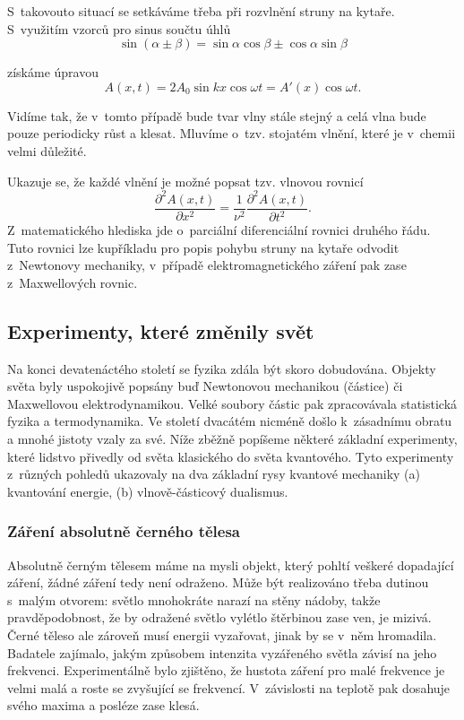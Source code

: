 \noindent S~takovouto situací se setkáváme třeba při rozvlnění struny na kytaře. S~využitím vzorců pro sinus součtu úhlů
\begin{equation}
\sin(\alpha \pm \beta) = \sin \alpha\cos\beta \pm \cos\alpha\sin\beta
\label{rov:Vlna7}
\end{equation}

\noindent získáme úpravou
\begin{equation}
A(x,t)=2A_0\sin kx \cos \omega t = A'(x)\cos \omega t.
\label{rov:Vlna8}
\end{equation}

\noindent Vidíme tak, že v~tomto případě bude tvar vlny stále stejný a celá vlna bude pouze periodicky růst a klesat. Mluvíme o~tzv. stojatém vlnění, které je v~chemii velmi důležité.

Ukazuje se, že každé vlnění je možné popsat tzv. vlnovou rovnicí
\begin{equation}
\frac{\partial ^2A(x,t)}{\partial x^2} = \frac{1}{\nu^2}\frac{\partial^2A(x,t)}{\partial t^2}\mbox{.}
\label{rov:Vlna9}
\end{equation}
Z~matematického hlediska jde o~parciální diferenciální rovnici druhého řádu. Tuto rovnici lze kupříkladu pro popis pohybu struny na kytaře odvodit z~Newtonovy mechaniky, v~případě elektromagnetického záření pak zase z~Maxwellových rovnic. 

\subsection{Experimenty, které změnily svět}

Na konci devatenáctého století se fyzika zdála být skoro dobudována. Objekty světa byly uspokojivě popsány buď Newtonovou mechanikou (částice) či Maxwellovou elektrodynamikou. Velké soubory částic pak zpracovávala statistická fyzika a termodynamika. Ve století dvacátém nicméně došlo k~zásadnímu obratu a mnohé jistoty vzaly za své. Níže zběžně popíšeme některé základní experimenty, které lidstvo přivedly od světa klasického do světa kvantového. Tyto experimenty z~různých pohledů ukazovaly na dva základní rysy kvantové mechaniky (a) kvantování energie, (b) vlnově-částicový dualismus.

\subsubsection{Záření absolutně černého tělesa}

Absolutně černým tělesem máme na mysli objekt, který pohltí veškeré dopadající záření, žádné záření tedy není odraženo. Může být realizováno třeba dutinou s~malým otvorem: světlo mnohokráte narazí na stěny nádoby, takže pravděpodobnost, že by odražené světlo vylétlo štěrbinou zase ven, je mizivá. Černé těleso ale zároveň musí energii vyzařovat, jinak by se v~něm hromadila. Badatele zajímalo, jakým způsobem intenzita vyzářeného světla závisí na jeho frekvenci. Experimentálně bylo zjištěno, že hustota záření pro malé frekvence je velmi malá a roste se zvyšující se frekvencí. V~závislosti na teplotě pak dosahuje svého maxima a posléze zase klesá. 


